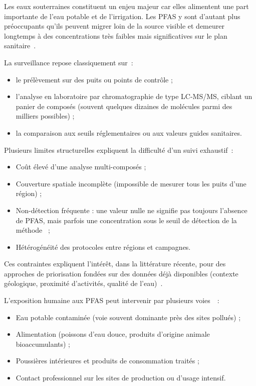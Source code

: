 \label{sec:pfas-surveillance}

Les eaux souterraines constituent un enjeu majeur car elles alimentent une part importante de l'eau potable et de l'irrigation.
Les PFAS y sont d'autant plus pr\'eoccupants qu'ils peuvent migrer loin de la source visible et demeurer longtemps \`a des concentrations tr\`es faibles mais significatives sur le plan sanitaire~\cite{hu2016pfas}.

La surveillance repose classiquement sur~:
\begin{itemize}
    \item le pr\'el\`evement sur des puits ou points de contr\^ole ;
    \item l'analyse en laboratoire par chromatographie de type LC-MS/MS, ciblant un panier de compos\'es (souvent quelques dizaines de mol\'ecules parmi des milliers possibles) ;
    \item la comparaison aux seuils r\'eglementaires ou aux valeurs guides sanitaires.
\end{itemize}

Plusieurs limites structurelles expliquent la difficult\'e d'un suivi exhaustif~:
\begin{itemize}
    \item Co\^ut \'elev\'e d'une analyse multi-compos\'es ;
    \item Couverture spatiale incompl\`ete (impossible de mesurer tous les puits d'une r\'egion) ;
    \item Non-d\'etection fr\'equente : une valeur nulle ne signifie pas toujours l'absence de PFAS, mais parfois une concentration sous le seuil de d\'etection de la m\'ethode~\cite{guelfo2021pfas} ;
    \item H\'et\'erog\'en\'eit\'e des protocoles entre r\'egions et campagnes.
\end{itemize}

Ces contraintes expliquent l'int\'er\^et, dans la litt\'erature r\'ecente, pour des approches de priorisation fond\'ees sur des donn\'ees d\'ej\`a disponibles (contexte g\'eologique, proximit\'e d'activit\'es, qualit\'e de l'eau)~\cite{dong2024pfas}.


\label{sec:pfas-reglementation}


L'exposition humaine aux PFAS peut intervenir par plusieurs voies~\cite{sunderland2019pfas}~:
\begin{itemize}
    \item Eau potable contamin\'ee (voie souvent dominante pr\`es des sites pollu\'es) ;
    \item Alimentation (poissons d'eau douce, produits d'origine animale bioaccumulants) ;
    \item Poussi\`eres int\'erieures et produits de consommation trait\'es ;
    \item Contact professionnel sur les sites de production ou d'usage intensif.
\end{itemize}

